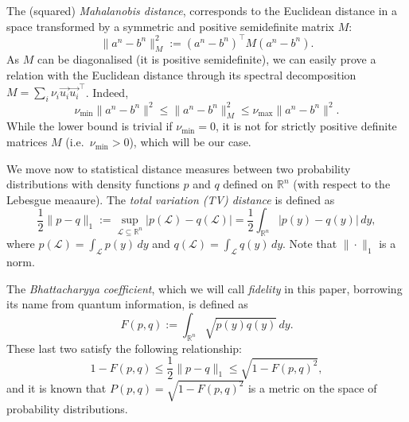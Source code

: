 \documentclass[10pt,conference]{IEEEtran}
\newcommand{\1}{\mathds{1}}
\newcommand{\RR}{\mathbb{R}}
\newcommand{\cL}{\mathcal{L}}
\newcommand{\pau}[1]{{\color{purple}#1}}
\begin{document}
The (squared) \emph{Mahalanobis distance}, corresponds to the Euclidean distance in a space transformed by a symmetric and positive semidefinite matrix $M$:
\begin{equation}
\label{eq:mahalanbobis}
    \|a^n-b^n\|_M^2 
      := (a^n - b^n)^\top M (a^n - b^n).
\end{equation}
As $M$ can be diagonalised (it is positive semidefinite), we can easily prove a relation with the Euclidean distance through its spectral decomposition $M=\sum_i\nu_i\vec{u_i}\vec{u_i}^\top$. Indeed,
\begin{equation}
  \label{eq:Mah-Euc}
  \nu_{\min} \|a^n-b^n\|^2
    \leq \|a^n-b^n\|_M^2
    \leq \nu_{\max} \|a^n-b^n\|^2.
\end{equation}
While the lower bound is trivial if $\nu_{\min}=0$, it is not for strictly positive definite matrices $M$ (i.e.~$\nu_{\min}>0$), which will be our case. 

We move now to statistical distance measures between two probability distributions with density functions $p$ and $q$ defined on $\RR^n$ (with respect to the Lebesgue meaaure). The \emph{total variation (TV) distance} is defined as
\begin{equation}
  \label{eq:TVD}
  \frac{1}{2} \|p-q\|_1 := \sup_{\cL \subseteq \RR^n} \big| p(\cL) - q(\cL) \big|
    = \frac{1}{2} \int_{\RR^n} |p(y) - q(y)| \, dy,
\end{equation}
where $p(\cL) = \int_{\cL} p(y) \, dy$ and $q(\cL) = \int_{\cL} q(y) \, dy$. Note that $\|\cdot\|_1$ is a norm.

The \emph{Bhattacharyya coefficient}, which we will call \emph{fidelity} in this paper, borrowing its name from quantum information, is defined as
\begin{equation}
  \label{eq:fidelitydef}
  F(p,q) := \int_{\RR^n} \sqrt{p(y) q(y)} \, dy.
\end{equation}
These last two satisfy the following relationship:
\begin{equation}\label{eq:FvdG}
    1 - F(p,q) \le \frac{1}{2} \|p-q\|_1 \le \sqrt{1 - F(p,q)^2},
\end{equation}
and it is known that $P(p,q) = \sqrt{1 - F(p,q)^2}$ is a metric on the space of probability distributions. 





\end{document}

